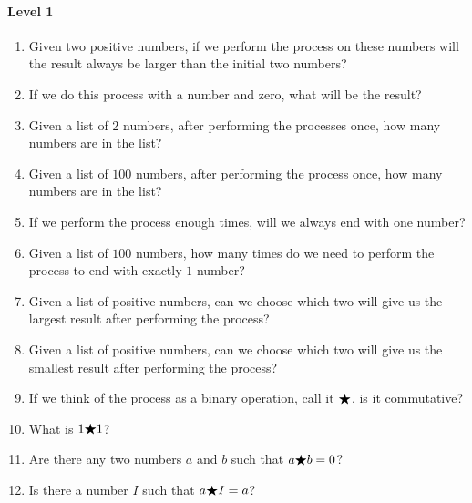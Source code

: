 \documentclass[handout,nooutcomes]{ximera}
\begin{document}
\begin{problem}
\begin{freeResponse}
  \paragraph{Level 1}
  \begin{enumerate}
    \item Given two positive numbers, if we perform the process on
      these numbers will the result always be larger than the initial
      two numbers?
    \item If we do this process with a number and zero, what will be
      the result?
    \item Given a list of $2$ numbers, after performing the processes
      once, how many numbers are in the list?
    \item Given a list of $100$ numbers, after performing the process
      once, how many numbers are in the list?
    \item If we perform the process enough times, will we always end
      with one number?
    \item Given a list of $100$ numbers, how many times do we need to
      perform the process to end with exactly $1$ number?
    \item Given a list of positive numbers, can we choose which two
      will give us the largest result after performing the process?
    \item Given a list of positive numbers, can we choose which two
      will give us the smallest result after performing the process?
    \item If we think of the process as a binary operation, call it
      $\bigstar$, is it commutative?
    \item What is $1 \bigstar 1$?
    \item Are there any two numbers $a$ and $b$ such that $a\bigstar b = 0$?
    \item Is there a number $I$ such that $a\bigstar I= a$?
  \end{enumerate}


\end{freeResponse}
\end{problem}
\end{document}
